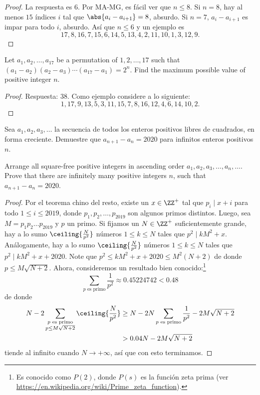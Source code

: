 \begin{proof}
	La respuesta es $6$. Por MA-MG, es fácil ver que $n\le 8$. Si $n=8$, hay al menos $15$ índices $i$ tal que $\abs{a_i-a_{i+1}}=8$, absurdo. Si $n=7$, $a_i-a_{i+1}$ es impar para todo $i$, absurdo. Así que $n\le 6$ y un ejemplo es
	\[17,8,16,7,15,6,14,5,13,4,2,11,10,1,3,12,9.\]
\end{proof}

\begin{probEG}[CSMO 2020/11.1]
	Let $a_1,a_2,\dots,a_{17}$ be a permutation of $1,2,\dots,17$ such that $(a_1-a_2)(a_2-a_3)\cdots(a_{17}-a_1)=2^n$. Find the maximum possible value of positive integer $n$.
\end{probEG}

\begin{proof}
	Respuesta: $38$. Como ejemplo considere a lo siguiente:
	\[1,17,9,13,5,3,11,15,7,8,16,12,4,6,14,10,2.\]
\end{proof}

\begin{probMR}[CSMO 2020/11.7]
	Sea $a_1,a_2,a_3,\dots$ la secuencia de todos los enteros positivos libres de cuadrados, en forma creciente. Demuestre que $a_{n+1}-a_n=2020$ para infinitos enteros positivos $n$.
	\begin{hint}
		Arrange all square-free positive integers in ascending order $a_1,a_2,a_3,\dots,a_n,\dots$. Prove that there are infinitely many positive integers $n$, such that $a_{n+1}-a_n=2020$.
	\end{hint}
\end{probMR}

\begin{proof}
	Por el teorema chino del resto, existe un $x\in\ZZ^+$ tal que $p_i\mid x+i$ para todo $1\le i\le 2019$, donde $p_1,p_2,\dots,p_{2019}$ son algunos primos distintos. Luego, sea $M=p_1p_2\dots p_{2019}$ y $p$ un primo. Si fijamos un $N\in\ZZ^+$ suficientemente grande, hay a lo sumo $\ceiling{\frac{N}{p^2}}$ números $1\le k\le N$ tales que $p^2\mid kM^2+x$. Análogamente, hay a lo sumo $\ceiling{\frac{N}{p^2}}$ números $1\le k\le N$ tales que $p^2\mid kM^2+x+2020$. Note que $p^2\le kM^2+x+2020\le M^2(N+2)$ de donde $p\le M\sqrt{N+2}$. Ahora, consideremos un resultado bien conocido:\footnote{Es conocido como $P(2)$, donde $P(s)$ es la función zeta prima (ver \url{https://en.wikipedia.org/wiki/Prime_zeta_function}).}
	\[\sum_{p\text{ es primo}}\frac{1}{p^2}\approx 0.45224742<0.48\]
	de donde
	\begin{align*}
		N-2\sum_{\substack{p\text{ es primo}\\p\le M\sqrt{N+2}}}\ceiling{\frac{N}{p^2}}
		&\ge N-2N\sum_{\substack{p\text{ es primo}}}\frac{1}{p^2}-2M\sqrt{N+2}\\
		&>0.04N-2M\sqrt{N+2}
	\end{align*}
	tiende al infinito cuando $N\to+\infty$, así que con esto terminamos.
\end{proof}
